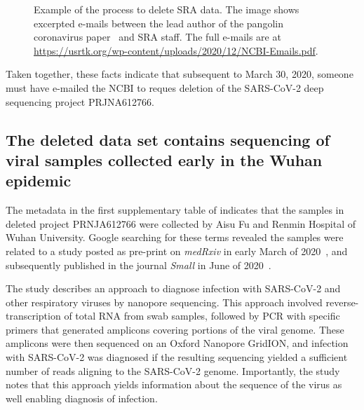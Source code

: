 \documentclass[9pt,twocolumn,twoside]{gsajnl_modified}
\begin{document}
\begin{figure}[]
\centering
{}
\caption{Example of the process to delete SRA data.
The image shows excerpted e-mails between the lead author of the pangolin coronavirus paper~\citep{xiao2020isolation} and SRA staff.
The full e-mails are at \url{https://usrtk.org/wp-content/uploads/2020/12/NCBI-Emails.pdf}.
}
\label{fig:pangolin_emails}
\end{figure}

Taken together, these facts indicate that subsequent to March 30, 2020, someone must have e-mailed the NCBI to reques deletion of the SARS-CoV-2 deep sequencing project PRJNA612766.

\subsection{The deleted data set contains sequencing of viral samples collected early in the Wuhan epidemic}
The metadata in the first supplementary table of \citet{farkas2020insights} indicates that the samples in deleted project PRNJA612766 were collected by Aisu Fu and Renmin Hospital of Wuhan University.
Google searching for these terms revealed the samples were related to a study posted as pre-print on \textit{medRxiv} in early March of 2020~\citep{Wang2020medRxiv}, and subsequently published in the journal \textit{Small} in June of 2020~\citep{Wang2020small}.

The study describes an approach to diagnose infection with SARS-CoV-2 and other respiratory viruses by nanopore sequencing.
This approach involved reverse-transcription of total RNA from swab samples, followed by PCR with specific primers that generated amplicons covering portions of the viral genome.
These amplicons were then sequenced on an Oxford Nanopore GridION, and infection with SARS-CoV-2 was diagnosed if the resulting sequencing yielded a sufficient number of reads aligning to the SARS-CoV-2 genome.
Importantly, the study notes that this approach yields information about the sequence of the virus as well enabling diagnosis of infection.
\end{document}

